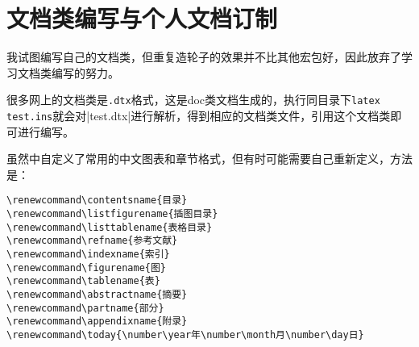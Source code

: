 \section{文档类编写与个人文档订制}
我试图编写自己的文档类，但重复造轮子的效果并不比其他宏包好，因此放弃了学习文档类编写的努力。



很多网上的文档类是\verb|.dtx|格式，这是doc类文档生成的，执行同目录下\verb|latex test.ins|就会对|test.dtx|进行解析，得到相应的文档类文件，引用这个文档类即可进行编写。

虽然\CTeX 中自定义了常用的中文图表和章节格式，但有时可能需要自己重新定义，方法是：
\begin{lstlisting}
\renewcommand\contentsname{目录} 
\renewcommand\listfigurename{插图目录} 
\renewcommand\listtablename{表格目录} 
\renewcommand\refname{参考文献} 
\renewcommand\indexname{索引} 
\renewcommand\figurename{图} 
\renewcommand\tablename{表} 
\renewcommand\abstractname{摘要} 
\renewcommand\partname{部分} 
\renewcommand\appendixname{附录} 
\renewcommand\today{\number\year年\number\month月\number\day日} 
\end{lstlisting}